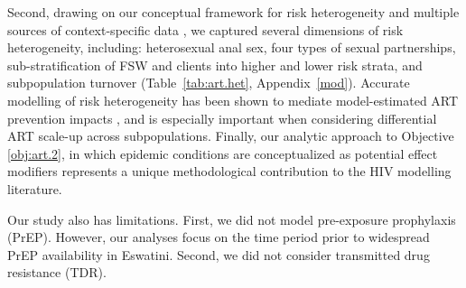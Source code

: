 Second, drawing on our conceptual framework for risk heterogeneity \cite[Table~1]{Knight2022sr}
and multiple sources of context-specific data
\cite{SDHS2006,SHIMS1,SHIMS2,Baral2014,EswKP2014,EswIBBS2022},
we captured several dimensions of risk heterogeneity, including:
heterosexual anal sex,
four types of sexual partnerships,
sub-stratification of FSW and clients into higher and lower risk strata,
and subpopulation turnover
(Table~\ref{tab:art.het}, Appendix~\ref{mod}).
Accurate modelling of risk heterogeneity
has been shown to mediate model-estimated ART prevention impacts \cite{Hontelez2013},
and is especially important when considering differential ART scale-up across subpopulations.
Finally, our analytic approach to Objective \ref{obj:art.2},
in which epidemic conditions are conceptualized as potential effect modifiers
represents a unique methodological contribution to the HIV modelling literature.
\par
Our study also has limitations.
First, we did not model pre-exposure prophylaxis (PrEP).
However, our analyses focus on the time period
prior to widespread PrEP availability in Eswatini.
Second, we did not consider transmitted drug resistance (TDR).
